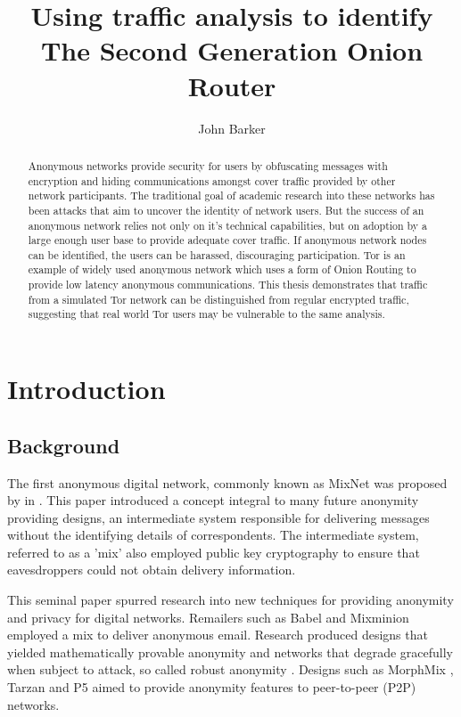 \documentclass{ecuthesis}
\title{Using traffic analysis to identify The Second Generation Onion Router}
\author{John Barker}
\begin{document}
\maketitle

\tableofcontents
\listoftables
\listoffigures

\begin{abstract}
\thispagestyle{empty}

Anonymous networks provide security for users by obfuscating messages with
encryption and hiding communications amongst cover traffic provided by other
network participants. The traditional goal of academic research into these
networks has been attacks that aim to uncover the identity of network users.
But the success of an anonymous network relies not only on it's technical
capabilities, but on adoption by a large enough user base to provide adequate
cover traffic. If anonymous network nodes can be identified, the users
can be harassed, discouraging participation. Tor is an example of widely used
anonymous network which uses a form of Onion Routing to provide low latency
anonymous communications. This thesis demonstrates that traffic from a simulated
Tor network can be distinguished from regular encrypted traffic, suggesting that
real world Tor users may be vulnerable to the same analysis.

\end{abstract}

\chapter{Introduction}

\section{Background}

The first anonymous digital network, commonly known as MixNet was proposed by
\citeauthor{Chaum:1981p296} in 
\parencite{Chaum:1981p296}. This paper introduced a concept integral to many
future anonymity providing designs, an intermediate system responsible for
delivering messages without the identifying details of correspondents. The
intermediate system, referred to as a 'mix' also employed public key
cryptography to ensure that eavesdroppers could not obtain delivery information.

This seminal paper spurred research into new techniques for providing anonymity
and privacy for digital networks. Remailers such as Babel
\parencite{Gulcu:1996p1662} and Mixminion \parencite{Danezis:2003ys} employed a
mix to deliver anonymous email. Research produced designs that yielded
mathematically provable anonymity
\parencite{Chaum:1988p5869,Waidner:1989p5870,Berman:2004p303} and networks that
degrade gracefully when subject to attack, so called robust anonymity
\parencite{Waidner:1989p5870,Jakobsson:1998p5137}. Designs such as MorphMix
\parencite{Rennhard:2002p4559}, Tarzan \parencite{Freedman:2002kx} and P5
\parencite{P5Sherwood:2005p5872} aimed to provide anonymity features to
peer-to-peer (P2P) networks.
\end{document}
